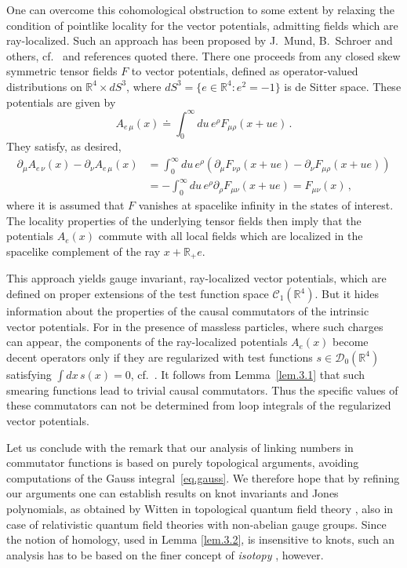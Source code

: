 \documentclass[11pt]{article}
\numberwithin{equation}{section}
\newcommand{\RR}{{\mathbb R}}
\newcommand{\Cc}{{\mathcal{C}}}
\newcommand{\Dc}{{\mathcal{D}}}
\begin{document}
\medskip
One can overcome this cohomological obstruction to some
extent by relaxing the 
condition of pointlike locality for the vector potentials, admitting 
fields which are ray-localized. Such an approach   
has been proposed by J.~Mund, B.~Schroer and others, cf.~\cite{MuOl} 
and references quoted there. There 
one proceeds from any closed skew symmetric tensor fields $F$
to vector potentials, defined as operator-valued 
distributions on $\RR^4 \times dS^3$,
where $dS^3 = \{ e \in \RR^4 : e^2 = -1 \}$ is de Sitter space.
These potentials are given by  
$$
A_{e \, \mu}(x) \doteq \int_0^\infty \!  du \, e^\rho F_{\mu \rho}(x + ue) \, .
$$ 
They satisfy, as desired,  
\begin{align*}
\partial_\mu A_{e \, \nu}(x) - \partial_\nu A_{e \, \mu}(x)
& = \int_0^\infty \!  du \, e^\rho (\partial_\mu F_{\nu \rho}(x + ue) 
- \partial_\nu F_{\mu \rho}(x + ue))  \\
& = - 
\int_0^\infty \!  du \, e^\rho \partial_\rho 
F_{\mu \nu}(x + ue) = F_{\mu \nu}(x) \, ,
\end{align*}
where it is assumed that $F$ vanishes at spacelike infinity
in the states of interest. The locality properties of the underlying
tensor fields then imply that the potentials 
$A_e(x)$ commute with all local fields which 
are localized in the spacelike complement of the 
ray $x + \RR_+ e$.

\medskip 
This approach yields gauge invariant,  
ray-localized vector potentials, which are defined on 
proper extensions of the test  
function space  $\Cc_1(\RR^4)$. But it hides 
information about the properties of the 
causal commutators of the intrinsic vector potentials. 
For in the presence of massless particles, where
such charges can appear, the components of the 
ray-localized potentials $A_e(x)$ become decent operators 
only if they are regularized  with test 
functions $s \in \Dc_0(\RR^4)$ satisfying 
$\int \! dx \, s(x) = 0$, cf.\ \cite[Sec.~3.4]{MuOl}. 
It follows from Lemma~\ref{lem.3.1} that such smearing functions
lead to trivial causal commutators. Thus the specific 
values of these commutators can not be determined 
from loop integrals of the regularized vector 
potentials.  

\medskip
Let us conclude with the remark that our  
analysis of linking numbers in commutator functions is based on 
purely topological arguments, avoiding computations
of the Gauss integral~\eqref{eq.gauss}. 
We therefore hope that by refining our arguments 
one can establish results on knot invariants and Jones polynomials,  
as obtained by Witten in topological quantum field theory \cite{Witten},  
also in case of relativistic quantum field theories with non-abelian
gauge groups. Since the notion of homology, used in Lemma \ref{lem.3.2}, 
is insensitive to knots, such an analysis has to be based on the 
finer concept of \emph{isotopy} \cite{BaMu,Spera}, however.  
\end{document}
